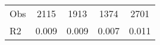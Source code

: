 \begin{tabular}{l*{4}{c}}
\hline                                                                                                                                                                                                                                            
 Obs                   &               2115               &       1913                       &       1374                &              2701                                               \\ 
 R2                    &                      0.009              &              0.009                      &              0.007               &                     0.011                                              \\ 
\hline \end{tabular}                                                                                                                                                                                                              